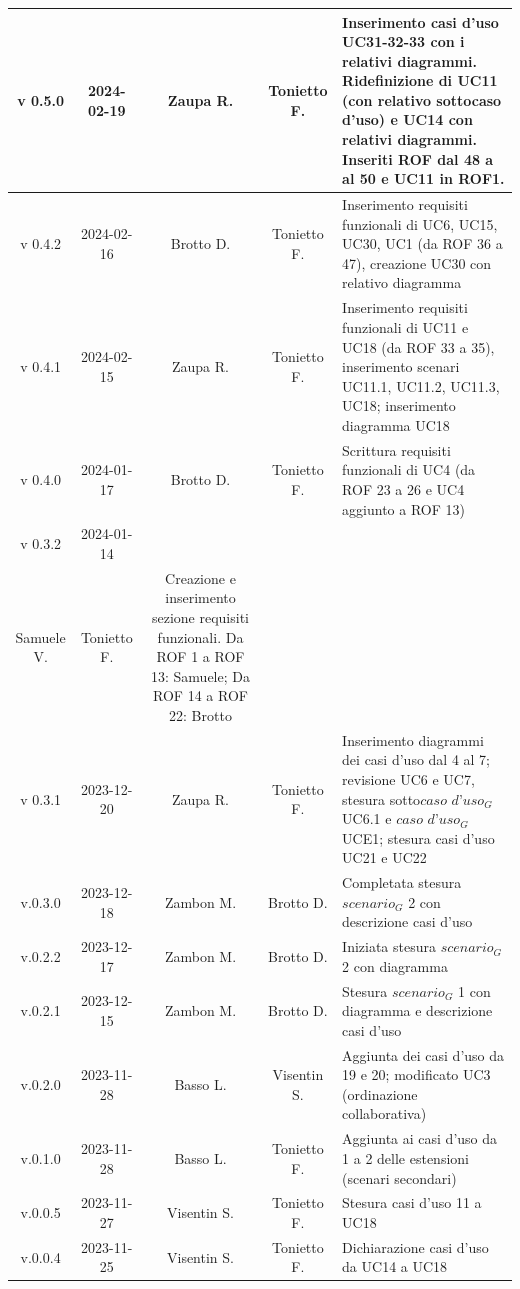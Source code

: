 \documentclass[12pt, oneside]{article}
\begin{document}
\begin{longtable}{|c|c|c|c|p{7cm}|}
\hline
v 0.5.0 & 2024-02-19 & Zaupa R. & Tonietto F. & Inserimento casi d'uso UC31-32-33 con i relativi diagrammi. Ridefinizione di UC11 (con relativo sottocaso d'uso) e UC14 con relativi diagrammi. Inseriti ROF dal 48 a al 50 e UC11 in ROF1. \\
\hline
v 0.4.2 & 2024-02-16 & Brotto D. & Tonietto F. & Inserimento requisiti funzionali di UC6, UC15, UC30, UC1 (da ROF 36 a 47), creazione UC30 con relativo diagramma \\
\hline
v 0.4.1 & 2024-02-15 & Zaupa R. & Tonietto F. & Inserimento requisiti funzionali di UC11 e UC18 (da ROF 33 a 35), inserimento scenari UC11.1, UC11.2, UC11.3, UC18; inserimento diagramma UC18 \\
\hline
v 0.4.0 & 2024-01-17 & Brotto D. & Tonietto F. & Scrittura requisiti funzionali di UC4 (da ROF 23 a 26 e UC4 aggiunto a ROF 13) \\
\hline
v 0.3.2 & 2024-01-14 & 
\begin{tabular}[c]{@{}c@{}}
    Davide B. \\
    Samuele V.
  \end{tabular} 
& Tonietto F. & Creazione e inserimento sezione requisiti funzionali. Da ROF 1 a ROF 13: Samuele; Da ROF 14 a ROF 22: Brotto\\
\hline
v 0.3.1 & 2023-12-20 & Zaupa R. & Tonietto F. & Inserimento diagrammi dei casi d'uso dal 4 al 7; revisione  UC6 e UC7, stesura sotto$\textit{caso d'uso}_G$ UC6.1 e $\textit{caso d'uso}_G$ UCE1; stesura casi d'uso UC21 e UC22 \\
\hline
v.0.3.0 & 2023-12-18 & Zambon M. & Brotto D. & Completata stesura $\textit{scenario}_G$ 2 con descrizione casi d'uso \\
\hline
v.0.2.2 & 2023-12-17 & Zambon M. & Brotto D. & Iniziata stesura $\textit{scenario}_G$ 2 con diagramma \\
\hline
v.0.2.1 & 2023-12-15 & Zambon M. & Brotto D. & Stesura $\textit{scenario}_G$ 1 con diagramma e descrizione casi d'uso \\
\hline
v.0.2.0 & 2023-11-28 & Basso L. & Visentin S. & Aggiunta dei casi d'uso da 19 e 20; modificato UC3 (ordinazione collaborativa) \\
\hline
v.0.1.0 & 2023-11-28 & Basso L. & Tonietto F. & Aggiunta ai casi d'uso da 1 a 2 delle estensioni (scenari secondari) \\
\hline
v.0.0.5 & 2023-11-27 & Visentin S. & Tonietto F. & Stesura casi d'uso 11 a UC18 \\
\hline
v.0.0.4 & 2023-11-25 & Visentin S. & Tonietto F. & Dichiarazione casi d'uso da UC14 a UC18 \\

\end{longtable}
\end{document}
